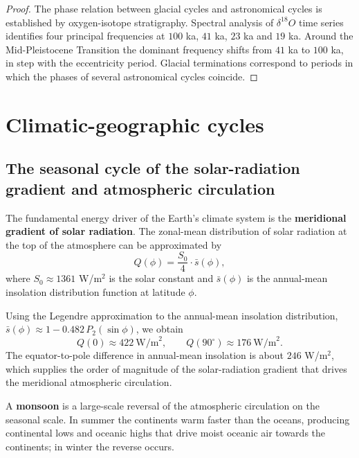 \begin{proof}
The phase relation between glacial cycles and astronomical cycles is established by oxygen-isotope stratigraphy. Spectral analysis of $\delta^{18}O$ time series identifies four principal frequencies at $100$ ka, $41$ ka, $23$ ka and $19$ ka. Around the Mid-Pleistocene Transition the dominant frequency shifts from $41$ ka to $100$ ka, in step with the eccentricity period. Glacial terminations correspond to periods in which the phases of several astronomical cycles coincide.
\end{proof}

\section{Climatic-geographic cycles}
\label{sec:climate_geographic_cycles}

\subsection{The seasonal cycle of the solar-radiation gradient and atmospheric circulation}

\begin{definition}\label{def:solar_insolation_gradient}
The fundamental energy driver of the Earth's climate system is the \textbf{meridional gradient of solar radiation}. The zonal-mean distribution of solar radiation at the top of the atmosphere can be approximated by
\[
Q(\phi)=\frac{S_0}{4}\cdot\bar{s}(\phi),
\]
where $S_0\approx 1361$ W/m$^2$ is the solar constant and $\bar{s}(\phi)$ is the annual-mean insolation distribution function at latitude $\phi$.
\end{definition}

\begin{example}\label{ch19_insolation_gradient_example}
Using the Legendre approximation to the annual-mean insolation distribution, $\bar{s}(\phi)\approx 1-0.482\,P_2(\sin\phi)$, we obtain
\[
Q(0)\approx 422\ \text{W/m}^2,\qquad Q(90^\circ)\approx 176\ \text{W/m}^2.
\]
The equator-to-pole difference in annual-mean insolation is about $246$ W/m$^2$, which supplies the order of magnitude of the solar-radiation gradient that drives the meridional atmospheric circulation.
\end{example}

\begin{definition}\label{def:monsoon_system}
A \textbf{monsoon} is a large-scale reversal of the atmospheric circulation on the seasonal scale. In summer the continents warm faster than the oceans, producing continental lows and oceanic highs that drive moist oceanic air towards the continents; in winter the reverse occurs.
\end{definition}

